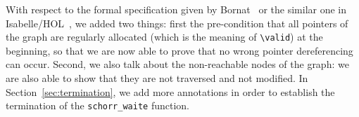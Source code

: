 With respect to the formal specification given by
Bornat~\cite{bornat00mpc} or the similar one in
Isabelle/HOL~\cite{mehta03cade}, we added two things: first the
pre-condition that all pointers of the graph are regularly
allocated (which is the meaning of \verb|\valid|) at the beginning, so
that we are now able to prove that no 
wrong pointer dereferencing can occur. Second, we also talk about the
non-reachable nodes of the graph: we are also able to show that they
are not traversed and not modified. In Section~\ref{sec:termination},
we add more annotations in order to establish the termination of the
\verb|schorr_waite| function.


